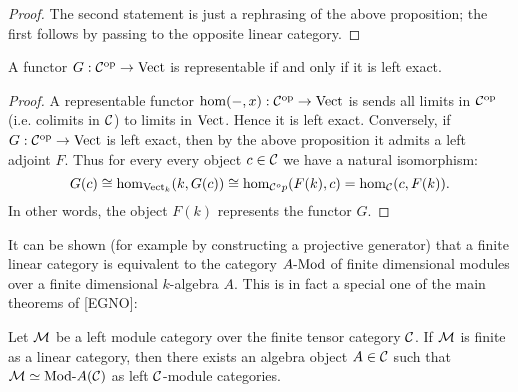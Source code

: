 \documentclass{amsart}
\begin{document}
\begin{proof}
	The second statement is just a rephrasing of the above proposition; the first follows by passing to the opposite linear category.  
\end{proof}


\begin{corollary}
 A functor $G: \mathcal C^\textrm{op} \to \mathrm{Vect}$ is representable if and only if it is left exact. 
\end{corollary}

\begin{proof}
	A representable functor $\hom(-, x):\mathcal C^\text{op} \to \mathrm{Vect}$ is sends all limits in $\mathcal C^\text{op}$ (i.e. colimits in $\mathcal C$) to limits in $\mathrm{Vect}$. Hence it is left exact. 
%
%		
Conversely, if $G: \mathcal C^\text{op} \to \mathrm{Vect}$ is left exact, then by the above proposition it admits a left adjoint $F$. Thus for every every object $c \in \mathcal C$ we have a natural isomorphism:
	\begin{equation*}
		G(c) \cong \hom_{\mathrm{Vect}_k}( k, G(c)) \cong \hom_{\mathcal C^op}( F(k), c) = \hom_{\mathcal C}(c, F(k) ).
	\end{equation*}
	In other words,  the object $F(k)$ represents the functor $G$. 
\end{proof}

	
	It can be shown (for example by constructing a projective generator) that a finite linear category is equivalent to the category $\Mod{A}{}$ of finite dimensional modules over a finite dimensional $k$-algebra $A$.
This is in fact a special one of the main theorems of [EGNO]: 

\begin{theorem}[EGNO 2.11.6(i)] \label{thm:EGNO2.11.6}
	Let $\mathcal M$ be a left module category over the finite tensor category $\mathcal C$. If $\mathcal M$ is finite as a linear category, then there exists an algebra object $A \in \mathcal C$ such that $\cM \simeq \Mod{}{A} (\cC)$ as left $\mathcal C$-module categories. 
\end{theorem}
\end{document}
